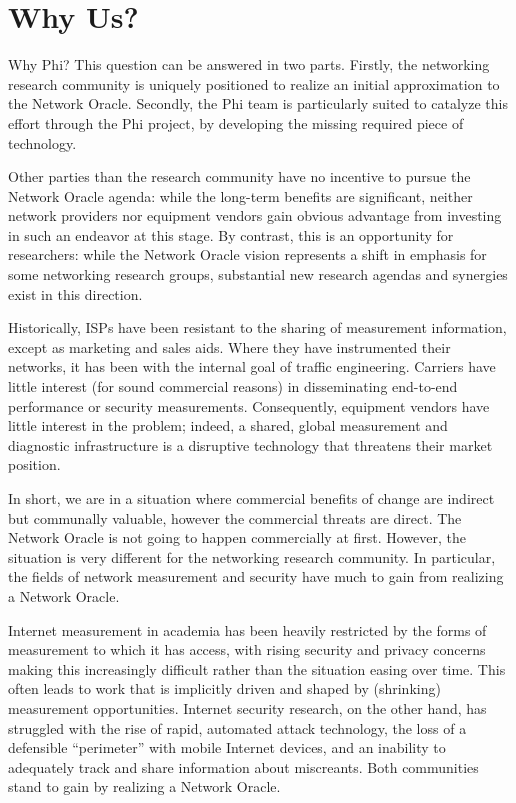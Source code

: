 \documentclass[twocolumn,10pt]{article}
\newcommand{\note}[1]{}
\def\Sys{Network Oracle\xspace}
\def\Lrp{Phi\xspace}
\begin{document}
\section{Why Us?}
\label{sec:whyus}

\note{Retool this section so as to articulate why it is researchers
  who will build the \Sys, and it is \Lrp that supplies the missing
  part of the puzzle.}

Why \Lrp?  This question can be answered in two parts.  Firstly, the
networking research community is uniquely positioned to realize an initial
approximation to the \Sys.  Secondly, the \Lrp team is particularly
suited to catalyze this effort through the \Lrp project, by developing
the missing required piece of technology.  

Other parties than the research community have no incentive to pursue
the \Sys agenda: while  
the long-term benefits are significant, neither network providers nor
equipment vendors gain obvious advantage from investing in such an
endeavor at this stage. By contrast, this is an opportunity for
researchers: while the \Sys vision represents a shift in emphasis
for some networking research groups, substantial new research agendas
and synergies exist in this direction. 

Historically, ISPs have been resistant to
the sharing of measurement information, except as marketing and sales
aids.  Where they have instrumented their networks, it has been with
the internal goal of traffic engineering.    Carriers have little
interest (for sound commercial reasons) in disseminating end-to-end
performance or security measurements.   Consequently, equipment
vendors have little interest in the problem; indeed, a shared, global
measurement and diagnostic infrastructure is a disruptive technology that
threatens their market position. 

In short, we are in a situation where commercial
benefits of change are indirect but communally valuable, however the
commercial threats are direct.  The \Sys is not going to happen
commercially at first. 
However, the situation is very different for the networking research
community.  In particular, the fields of network measurement and
security have much to gain from realizing a \Sys. 

Internet measurement in academia has been heavily restricted by the forms of
measurement to which it has access, with rising security and privacy
concerns making this increasingly difficult rather than the
situation easing over time.  This often leads to 
work that is implicitly
driven and shaped by (shrinking) measurement opportunities. 
Internet security research, on the other hand, has struggled
with the rise of rapid, automated attack technology, 
the loss of a defensible ``perimeter'' with mobile Internet
devices, and an inability to adequately track and share
information about miscreants.  Both communities stand to gain
by realizing a \Sys.
\end{document}

